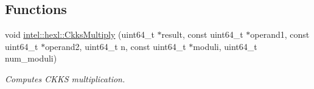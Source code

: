 \subsection*{Functions}
\begin{DoxyCompactItemize}
\item 
void \hyperlink{namespaceintel_1_1hexl_a287608abb254a6f0eeb3c7ca95e85a71}{intel\+::hexl\+::\+Ckks\+Multiply} (uint64\+\_\+t $\ast$result, const uint64\+\_\+t $\ast$operand1, const uint64\+\_\+t $\ast$operand2, uint64\+\_\+t n, const uint64\+\_\+t $\ast$moduli, uint64\+\_\+t num\+\_\+moduli)
\begin{DoxyCompactList}\small\item\em Computes C\+K\+KS multiplication. \end{DoxyCompactList}\end{DoxyCompactItemize}
